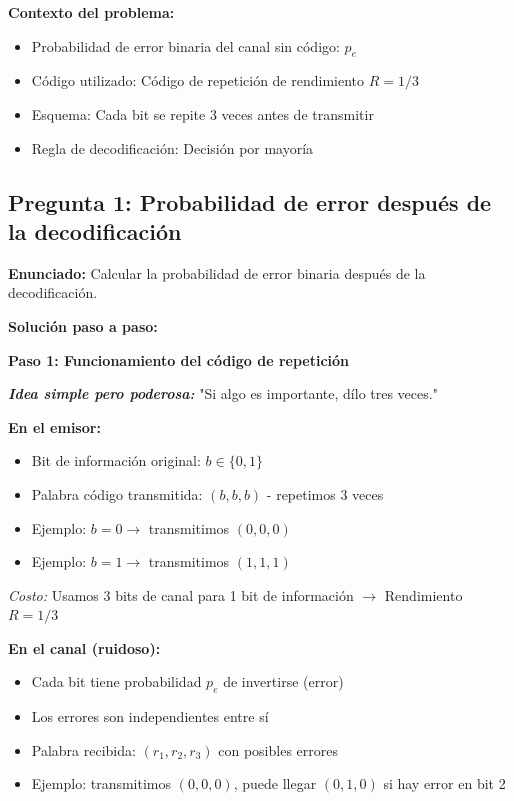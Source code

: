 \documentclass[11pt,a4paper]{article}
\begin{document}
\textbf{Contexto del problema:}

\begin{itemize}
    \item Probabilidad de error binaria del canal sin c\'odigo: $p_e$
    \item C\'odigo utilizado: C\'odigo de repetici\'on de rendimiento $R = 1/3$
    \item Esquema: Cada bit se repite 3 veces antes de transmitir
    \item Regla de decodificaci\'on: Decisi\'on por mayor\'ia
\end{itemize}

\subsection*{Pregunta 1: Probabilidad de error despu\'es de la decodificaci\'on}

\textbf{Enunciado:} Calcular la probabilidad de error binaria despu\'es de la decodificaci\'on.

\vspace{0.3cm}
\textbf{Soluci\'on paso a paso:}

\textbf{Paso 1: Funcionamiento del c\'odigo de repetici\'on}

\textit{\textbf{Idea simple pero poderosa:}} "Si algo es importante, d\'ilo tres veces."

\textbf{En el emisor:}
\begin{itemize}
    \item Bit de informaci\'on original: $b \in \{0, 1\}$
    \item Palabra c\'odigo transmitida: $(b, b, b)$ - repetimos 3 veces
    \item Ejemplo: $b=0 \to$ transmitimos $(0, 0, 0)$
    \item Ejemplo: $b=1 \to$ transmitimos $(1, 1, 1)$
\end{itemize}

\textit{Costo:} Usamos 3 bits de canal para 1 bit de informaci\'on $\to$ Rendimiento $R = 1/3$

\textbf{En el canal (ruidoso):}
\begin{itemize}
    \item Cada bit tiene probabilidad $p_e$ de invertirse (error)
    \item Los errores son independientes entre s\'i
    \item Palabra recibida: $(r_1, r_2, r_3)$ con posibles errores
    \item Ejemplo: transmitimos $(0,0,0)$, puede llegar $(0,1,0)$ si hay error en bit 2
\end{itemize}
\end{document}
